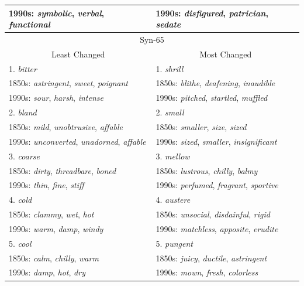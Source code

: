 \documentclass[output=paper]{langsci/langscibook}
\begin{document}
\begin{footnotesize}
\begin{longtable}{ll}
\qquad 1990s: {\it symbolic}, {\it verbal}, {\it functional} & \qquad 1990s: {\it disfigured}, {\it patrician}, {\it sedate} \\\midrule
\multicolumn{2}{c}{{{\sc Syn-65}}} \\
\multicolumn{1}{c}{{Least Changed}} & \multicolumn{1}{c}{{Most Changed}} \\\midrule
1. {\it bitter} & 1. {\it shrill} \\
\qquad 1850s: {\it astringent}, {\it sweet}, {\it poignant} & \qquad 1850s: {\it blithe}, {\it deafening}, {\it inaudible} \\
\qquad 1990s: {\it sour}, {\it harsh}, {\it intense} & \qquad 1990s: {\it pitched}, {\it startled}, {\it muffled} \\
2. {\it bland} & 2. {\it small} \\
\qquad 1850s: {\it mild}, {\it unobtrusive}, {\it affable} & \qquad 1850s: {\it smaller}, {\it size}, {\it sized} \\
\qquad 1990s: {\it unconverted}, {\it unadorned}, {\it affable} & \qquad 1990s: {\it sized}, {\it smaller}, {\it insignificant} \\
3. {\it coarse} & 3. {\it mellow} \\
\qquad 1850s: {\it dirty}, {\it threadbare}, {\it boned} & \qquad 1850s: {\it lustrous}, {\it chilly}, {\it balmy} \\
\qquad 1990s: {\it thin}, {\it fine}, {\it stiff} & \qquad 1990s: {\it perfumed}, {\it fragrant}, {\it sportive} \\
4. {\it cold} & 4. {\it austere} \\
\qquad 1850s: {\it clammy}, {\it wet}, {\it hot} & \qquad 1850s: {\it unsocial}, {\it disdainful}, {\it rigid} \\
\qquad 1990s: {\it warm}, {\it damp}, {\it windy} & \qquad 1990s: {\it matchless}, {\it apposite}, {\it erudite} \\
5. {\it cool} & 5. {\it pungent} \\
\qquad 1850s: {\it calm}, {\it chilly}, {\it warm} & \qquad 1850s: {\it juicy}, {\it ductile}, {\it astringent} \\
\qquad 1990s: {\it damp}, {\it hot}, {\it dry} & \qquad 1990s: {\it mown}, {\it fresh}, {\it colorless} \\
\end{longtable}
\end{footnotesize}

{\sloppy\printbibliography[heading=subbibliography,notkeyword=this]}
\end{document}
